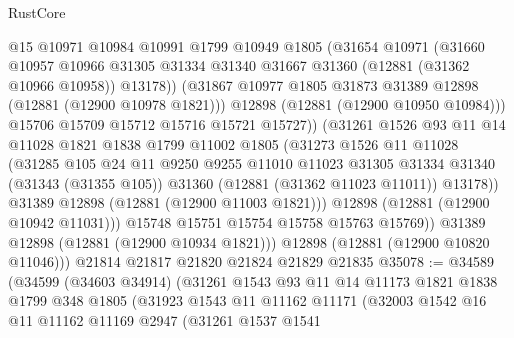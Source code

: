 \begin{lexlean}{RustCore}
\begin{coremodule}
                    @15
                    @10971
                    @10984
                    @10991
                    @1799
                    @10949
                    @1805
                    (@31654
                      @10971
                      (@31660
                        @10957
                        @10966
                        @31305
                        @31334
                        @31340
                        @31667
                        @31360
                        (@12881 (@31362 @10966 @10958))
                        @13178))
                    (@31867 @10977 @1805 @31873 @31389 @12898 (@12881 (@12900 @10978 @1821)))
                    @12898
                    (@12881 (@12900 @10950 @10984)))
                  @15706
                  @15709
                  @15712
                  @15716
                  @15721
                  @15727))
              (@31261
                @1526
                @93
                @11
                @14
                @11028
                @1821
                @1838
                @1799
                @11002
                @1805
                (@31273
                  @1526
                  @11
                  @11028
                  (@31285
                    @105
                    @24
                    @11
                    @9250
                    @9255
                    @11010
                    @11023
                    @31305
                    @31334
                    @31340
                    (@31343 (@31355 @105))
                    @31360
                    (@12881 (@31362 @11023 @11011))
                    @13178))
                @31389
                @12898
                (@12881 (@12900 @11003 @1821)))
              @12898
              (@12881 (@12900 @10942 @11031)))
            @15748
            @15751
            @15754
            @15758
            @15763
            @15769))
        @31389
        @12898
        (@12881 (@12900 @10934 @1821)))
      @12898
      (@12881 (@12900 @10820 @11046)))
    @21814
    @21817
    @21820
    @21824
    @21829
    @21835
@35078 := @34589
    (@34599
      (@34603 @34914)
      (@31261
        @1543
        @93
        @11
        @14
        @11173
        @1821
        @1838
        @1799
        @348
        @1805
        (@31923
          @1543
          @11
          @11162
          @11171
          (@32003
            @1542
            @16
            @11
            @11162
            @11169
            @2947
            (@31261
              @1537
              @1541

\end{coremodule}
\end{lexlean}
